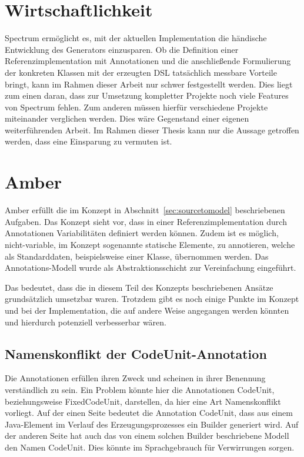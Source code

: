 \documentclass[12pt,oneside,a4paper,parskip]{scrbook}
\begin{document}
\section{Wirtschaftlichkeit}

Spectrum ermöglicht es, mit der aktuellen Implementation die händische Entwicklung des Generators einzusparen. Ob die Definition einer Referenzimplementation mit Annotationen und die anschließende Formulierung der konkreten Klassen mit der erzeugten DSL tatsächlich messbare Vorteile bringt, kann im Rahmen dieser Arbeit nur schwer festgestellt werden. Dies liegt zum einen daran, dass zur Umsetzung kompletter Projekte noch viele Features von Spectrum fehlen. Zum anderen müssen hierfür verschiedene Projekte miteinander verglichen werden. Dies wäre Gegenstand einer eigenen weiterführenden Arbeit. Im Rahmen dieser Thesis kann nur die Aussage getroffen werden, dass eine Einsparung zu vermuten ist.

\section{Amber}

Amber erfüllt die im Konzept in Abschnitt~\ref{sec:sourcetomodel} beschriebenen Aufgaben. Das Konzept sieht vor, dass in einer Referenzimplementation durch Annotationen Variabilitäten definiert werden können. Zudem ist es möglich, nicht-variable, im Konzept sogenannte statische Elemente, zu annotieren, welche als Standarddaten, beispielsweise einer Klasse, übernommen werden. Das Annotations-Modell wurde als Abstraktionsschicht zur Vereinfachung eingeführt.

Das bedeutet, dass die in diesem Teil des Konzepts beschriebenen Ansätze grundsätzlich umsetzbar waren. Trotzdem gibt es noch einige Punkte im Konzept und bei der Implementation, die auf andere Weise angegangen werden könnten und hierdurch potenziell verbesserbar wären.

\subsection{Namenskonflikt der CodeUnit-Annotation}

Die Annotationen erfüllen ihren Zweck und scheinen in ihrer Benennung verständlich zu sein. Ein Problem könnte hier die Annotationen CodeUnit, beziehungsweise FixedCodeUnit, darstellen, da hier eine Art Namenskonflikt vorliegt. Auf der einen Seite bedeutet die Annotation CodeUnit, dass aus einem Java-Element im Verlauf des Erzeugungsprozesses ein Builder generiert wird. Auf der anderen Seite hat auch das von einem solchen Builder beschriebene Modell den Namen CodeUnit. Dies könnte im Sprachgebrauch für Verwirrungen sorgen.
\end{document}

